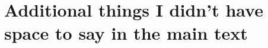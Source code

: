 \chapter{Additional things I didn't have space to say in the main text}\label{app:additionalThingsToSay}

\blindmathpaper

\cleardoublepage